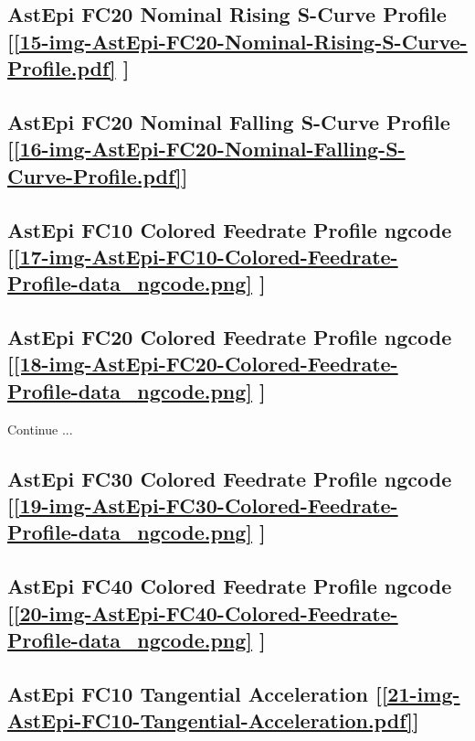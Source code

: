 \subsection     {AstEpi FC20 Nominal Rising S-Curve Profile
	[\ref      {15-img-AstEpi-FC20-Nominal-Rising-S-Curve-Profile.pdf} ] }
\label{ssec-15-img-AstEpi-FC20-Nominal-Rising-S-Curve-Profile.pdf}

\subsection     {AstEpi FC20 Nominal Falling S-Curve Profile
	[\ref      {16-img-AstEpi-FC20-Nominal-Falling-S-Curve-Profile.pdf}] }
\label{ssec-16-img-AstEpi-FC20-Nominal-Falling-S-Curve-Profile.pdf}

\subsection       {AstEpi FC10 Colored Feedrate Profile ngcode
	[\ref      {17-img-AstEpi-FC10-Colored-Feedrate-Profile-data_ngcode.png} ] }
\label{ssec-17-img-AstEpi-FC10-Colored-Feedrate-Profile-data_ngcode.png}

\subsection       {AstEpi FC20 Colored Feedrate Profile ngcode
	[\ref      {18-img-AstEpi-FC20-Colored-Feedrate-Profile-data_ngcode.png} ] }
\label{ssec-18-img-AstEpi-FC20-Colored-Feedrate-Profile-data_ngcode.png}

Continue ...\\

\subsection       {AstEpi FC30 Colored Feedrate Profile ngcode
	[\ref      {19-img-AstEpi-FC30-Colored-Feedrate-Profile-data_ngcode.png} ] }
\label{ssec-19-img-AstEpi-FC30-Colored-Feedrate-Profile-data_ngcode.png}

\subsection       {AstEpi FC40 Colored Feedrate Profile ngcode
	[\ref      {20-img-AstEpi-FC40-Colored-Feedrate-Profile-data_ngcode.png} ] }
\label{ssec-20-img-AstEpi-FC40-Colored-Feedrate-Profile-data_ngcode.png}

\subsection       {AstEpi FC10 Tangential Acceleration
	[\ref      {21-img-AstEpi-FC10-Tangential-Acceleration.pdf}] }
\label{ssec-21-img-AstEpi-FC10-Tangential-Acceleration.pdf}

